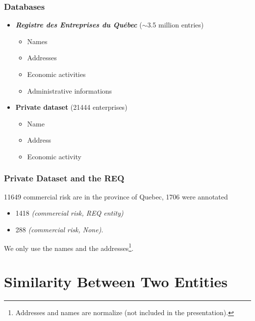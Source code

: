 \documentclass[aspectratio=169,10pt,xcolor=x11names,english,french]{beamer}
\begin{document}
	\begin{frame}[label=REQ]\frametitle{Databases} 
		\begin{itemize}
			\item 	\textbf{\textit{Registre des Entreprises du Québec}} ($\sim$3.5 million entries)
					\begin{itemize}
						\item Names
						\item Addresses
						\item Economic activities
						\item Administrative informations
					\end{itemize}
			\item 	\textbf{Private dataset} (\num{21444} enterprises)
			\begin{itemize}
				\item Name
				\item Address
				\item Economic activity
			\end{itemize}
		\end{itemize}
	\end{frame}
	
	\begin{frame}[label=intact-REQ]\frametitle{Private Dataset and the REQ} 
			\num{11649} commercial risk are in the province of Quebec, \num{1706} were annotated
				\begin{itemize}
					\item \num{1418} \textit{(commercial risk, REQ entity)}
					\item 288 \textit{(commercial risk, None)}.
				\end{itemize}
			We only use the names and the addresses\footnote{Addresses and names are normalize (not included in the presentation).}.
	\end{frame}
	
	\section{Similarity Between Two Entities}
	
\end{document}

